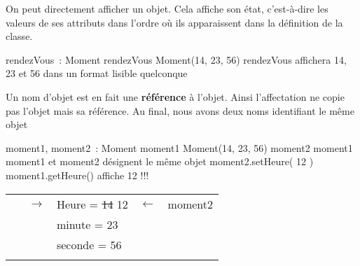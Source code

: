 	\begin{liste}
		\item
			On peut directement afficher un objet. Cela affiche son état,
			c'est-à-dire les valeurs de ses attributs dans
			l'ordre où ils apparaissent dans la définition de la
			classe.
			\\
			\bigskip
			\begin{Pseudocode}
				\Decl rendezVous~: Moment
				\Let rendezVous \Gets {} Moment(14, 23, 56)
				\Write rendezVous 
				\RComment affichera 14, 23 et 56 dans un format lisible quelconque
			\end{Pseudocode}
			\bigskip
		\item
			Un nom d'objet est en fait une \textbf{référence} à
			l'objet. Ainsi l'affectation ne copie
			pas l'objet mais sa référence. Au final, nous avons
			deux noms identifiant le même objet
			\\
			\bigskip
			\begin{Pseudocode}
				\Decl moment1, moment2~: Moment
				\Let moment1 \Gets {} Moment(14, 23, 56)
				\Let moment2 \Gets moment1
				\RComment moment1 et moment2 désignent le même objet
				\Stmt moment2.setHeure( 12 )
				\Write moment1.getHeure() 
				\RComment affiche 12 !!!
			\end{Pseudocode}
	
			\bigskip
	
			\begin{center}
			\begin{tabular}{m{2.19cm}m{2.2779999cm}|m{2.975cm}|m{2.34cm}m{2.146cm}}
			\hhline{-~-~-}
			\multicolumn{1}{|m{2.19cm}|}{\centering  moment1}
			&
			\centering \sffamily $\rightarrow$ &
			\centering  Heure = \sout{14} 12 &
			\multicolumn{1}{m{2.34cm}|}{\centering \sffamily
			$\leftarrow$} &
			\multicolumn{1}{m{2.146cm}|}{\centering\arraybslash
			 moment2}\\\hhline{-~~~-}
			~
			 &
			~
			 &
			\centering  minute = 23 &
			~
			 &
			~
			\\
			~
			 &
			~
			 &
			\centering  seconde = 56 &
			~
			 &
			~
			\\\hhline{~~-~~}
			\end{tabular}
			\end{center}
	
			\bigskip
	

\end{liste}
